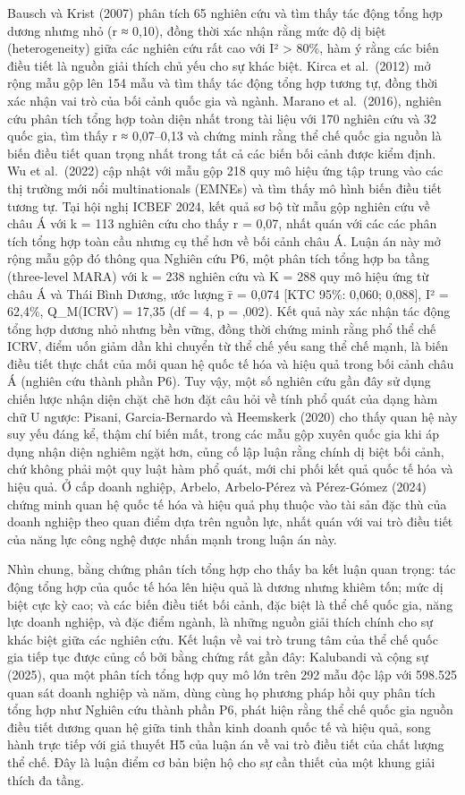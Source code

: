 \documentclass[
  a4paper,
  13pt]{extreport}
\begin{document}
Bausch và Krist (2007) phân tích 65 nghiên cứu và tìm thấy tác động tổng
hợp dương nhưng nhỏ (r ≈ 0,10), đồng thời xác nhận rằng mức độ dị biệt
(heterogeneity) giữa các nghiên cứu rất cao với I² \textgreater{} 80\%,
hàm ý rằng các biến điều tiết là nguồn giải thích chủ yếu cho sự khác
biệt. Kirca et al.~(2012) mở rộng mẫu gộp lên 154 mẫu và tìm thấy tác
động tổng hợp tương tự, đồng thời xác nhận vai trò của bối cảnh quốc gia
và ngành. Marano et al.~(2016), nghiên cứu phân tích tổng hợp toàn diện
nhất trong tài liệu với 170 nghiên cứu và 32 quốc gia, tìm thấy r ≈
0,07--0,13 và chứng minh rằng thể chế quốc gia nguồn là biến điều tiết
quan trọng nhất trong tất cả các biến bối cảnh được kiểm định. Wu et
al.~(2022) cập nhật với mẫu gộp 218 quy mô hiệu ứng tập trung vào các
thị trường mới nổi multinationals (EMNEs) và tìm thấy mô hình biến điều
tiết tương tự. Tại hội nghị ICBEF 2024, kết quả sơ bộ từ mẫu gộp nghiên
cứu về châu Á với k = 113 nghiên cứu cho thấy r = 0,07, nhất quán với
các các phân tích tổng hợp toàn cầu nhưng cụ thể hơn về bối cảnh châu Á.
Luận án này mở rộng mẫu gộp đó thông qua Nghiên cứu P6, một phân tích
tổng hợp ba tầng (three-level MARA) với k = 238 nghiên cứu và K = 288
quy mô hiệu ứng từ châu Á và Thái Bình Dương, ước lượng r̄ = 0,074 {[}KTC
95\%: 0,060; 0,088{]}, I² = 62,4\%, Q\_M(ICRV) = 17,35 (df = 4, p =
,002). Kết quả này xác nhận tác động tổng hợp dương nhỏ nhưng bền vững,
đồng thời chứng minh rằng phổ thể chế ICRV, điểm uốn giảm dần khi chuyển
từ thể chế yếu sang thể chế mạnh, là biến điều tiết thực chất của mối
quan hệ quốc tế hóa và hiệu quả trong bối cảnh châu Á (nghiên cứu thành
phần P6). Tuy vậy, một số nghiên cứu gần đây sử dụng chiến lược nhận
diện chặt chẽ hơn đặt câu hỏi về tính phổ quát của dạng hàm chữ U ngược:
Pisani, Garcia-Bernardo và Heemskerk (2020) cho thấy quan hệ này suy yếu
đáng kể, thậm chí biến mất, trong các mẫu gộp xuyên quốc gia khi áp dụng
nhận diện nghiêm ngặt hơn, củng cố lập luận rằng chính dị biệt bối cảnh,
chứ không phải một quy luật hàm phổ quát, mới chi phối kết quả quốc tế
hóa và hiệu quả. Ở cấp doanh nghiệp, Arbelo, Arbelo-Pérez và Pérez-Gómez
(2024) chứng minh quan hệ quốc tế hóa và hiệu quả phụ thuộc vào tài sản
đặc thù của doanh nghiệp theo quan điểm dựa trên nguồn lực, nhất quán
với vai trò điều tiết của năng lực công nghệ được nhấn mạnh trong luận
án này.

Nhìn chung, bằng chứng phân tích tổng hợp cho thấy ba kết luận quan
trọng: tác động tổng hợp của quốc tế hóa lên hiệu quả là dương nhưng
khiêm tốn; mức dị biệt cực kỳ cao; và các biến điều tiết bối cảnh, đặc
biệt là thể chế quốc gia, năng lực doanh nghiệp, và đặc điểm ngành, là
những nguồn giải thích chính cho sự khác biệt giữa các nghiên cứu. Kết
luận về vai trò trung tâm của thể chế quốc gia tiếp tục được củng cố bởi
bằng chứng rất gần đây: Kalubandi và cộng sự (2025), qua một phân tích
tổng hợp quy mô lớn trên 292 mẫu độc lập với 598.525 quan sát doanh
nghiệp và năm, dùng cùng họ phương pháp hồi quy phân tích tổng hợp như
Nghiên cứu thành phần P6, phát hiện rằng thể chế quốc gia nguồn điều
tiết dương quan hệ giữa tinh thần kinh doanh quốc tế và hiệu quả, song
hành trực tiếp với giả thuyết H5 của luận án về vai trò điều tiết của
chất lượng thể chế. Đây là luận điểm cơ bản biện hộ cho sự cần thiết của
một khung giải thích đa tầng.
\end{document}
